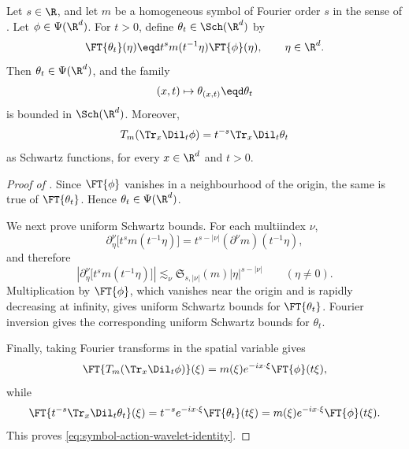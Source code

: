 \begin{lemma}
  \label{lem:symbol-action-wavelets}
  Let \(s \in \R\), and let \(m\) be a homogeneous symbol of Fourier order
  \(s\) in the sense of . Let
  \(\phi \in \Psi(\R^d)\). For \(t > 0\), define \(\theta_t \in \Sch(\R^d)\)
  by
  \begin{equation}
    \label{eq:symbol-action-wavelet}
    \FT{\theta_t}(\eta)
    \eqd
    t^s m(t^{-1}\eta)\FT{\phi}(\eta),
    \qquad
    \eta \in \R^d.
  \end{equation}
  Then \(\theta_t \in \Psi(\R^d)\), and the family
  \[
    (x,t) \mapsto \theta_{(x,t)} \eqd \theta_t
  \]
  is bounded in \(\Sch(\R^d)\). Moreover,
  \begin{equation}
    \label{eq:symbol-action-wavelet-identity}
    T_m(\Tr_x \Dil_t \phi)
    =
    t^{-s}\Tr_x \Dil_t \theta_t
  \end{equation}
  as Schwartz functions, for every \(x \in \R^d\) and \(t > 0\).
\end{lemma}

\begin{proof}[Proof of ]
  Since \(\FT{\phi}\) vanishes in a neighbourhood of the origin, the same is
  true of \(\FT{\theta_t}\). Hence \(\theta_t \in \Psi(\R^d)\).

  We next prove uniform Schwartz bounds. For each multiindex \(\nu\),
  \[
    \partial_{\eta}^{\nu}\bigl[t^s m(t^{-1}\eta)\bigr]
    =
    t^{s - |\nu|}
    (\partial^{\nu}m)(t^{-1}\eta),
  \]
  and therefore
  \[
    \left|
      \partial_{\eta}^{\nu}\bigl[t^s m(t^{-1}\eta)\bigr]
    \right|
    \lesssim_{\nu}
    \mathfrak{S}_{s, |\nu|}(m)
    |\eta|^{s - |\nu|}
    \qquad
    (\eta \neq 0).
  \]
  Multiplication by \(\FT{\phi}\), which vanishes near the origin and is
  rapidly decreasing at infinity, gives uniform Schwartz bounds for
  \(\FT{\theta_t}\). Fourier inversion gives the corresponding uniform
  Schwartz bounds for \(\theta_t\).

  Finally, taking Fourier transforms in the spatial variable gives
  \[
    \FT{T_m(\Tr_x \Dil_t \phi)}(\xi)
    =
    m(\xi)e^{-i x \cdot \xi}\FT{\phi}(t\xi),
  \]
  while
  \[
    \FT{t^{-s}\Tr_x \Dil_t \theta_t}(\xi)
    =
    t^{-s}e^{-i x \cdot \xi}\FT{\theta_t}(t\xi)
    =
    m(\xi)e^{-i x \cdot \xi}\FT{\phi}(t\xi).
  \]
  This proves \eqref{eq:symbol-action-wavelet-identity}.
\end{proof}

